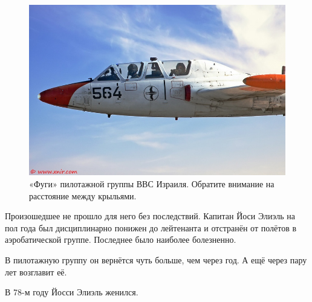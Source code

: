 \begin{figure}[h!tb] 
	\centering\includegraphics[scale=0.6]{History_Yosya/5YihKMW0Msk.jpg}
	\caption{«Фуги» пилотажной группы ВВС Израиля. Обратите внимание на расстояние между крыльями.}%
\end{figure}

Произошедшее не прошло для него без последствий. Капитан Йоси Элиэль на пол года был дисциплинарно понижен до лейтенанта и отстранён от полётов в аэробатической группе. Последнее было наиболее болезненно.

В пилотажную группу он вернётся чуть больше, чем через год. А ещё через пару лет возглавит её.

В 78-м году Йосси Элиэль женился.

